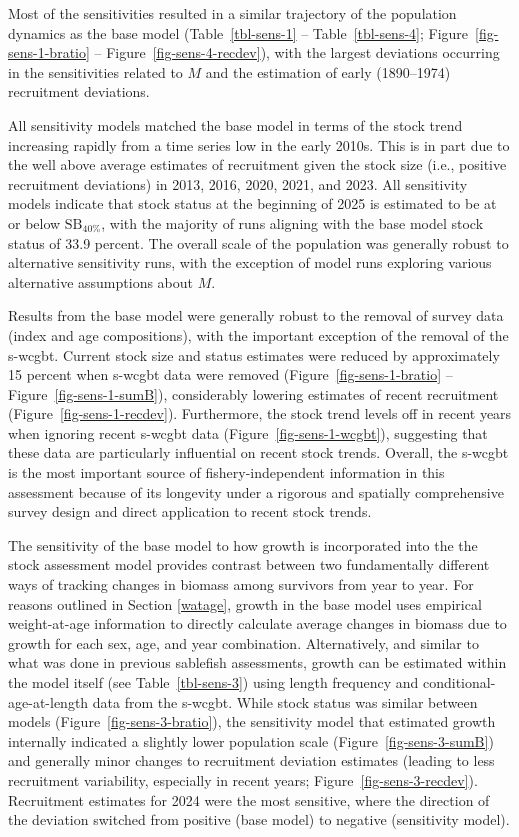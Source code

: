 \documentclass[
  english,
]{article}
\begin{document}
Most of the sensitivities resulted in a similar trajectory of the
population dynamics as the base model (Table~\ref{tbl-sens-1} --
Table~\ref{tbl-sens-4}; Figure~\ref{fig-sens-1-bratio} --
Figure~\ref{fig-sens-4-recdev}), with the largest deviations occurring
in the sensitivities related to \(M\) and the estimation of early
(1890--1974) recruitment deviations.

All sensitivity models matched the base model in terms of the stock
trend increasing rapidly from a time series low in the early 2010s. This
is in part due to the well above average estimates of recruitment given
the stock size (i.e., positive recruitment deviations) in 2013, 2016,
2020, 2021, and 2023. All sensitivity models indicate that stock status
at the beginning of 2025 is estimated to be at or below
\(\text{SB}_{40\%}\), with the majority of runs aligning with the base
model stock status of 33.9 percent. The overall scale of the population
was generally robust to alternative sensitivity runs, with the exception
of model runs exploring various alternative assumptions about \(M\).

Results from the base model were generally robust to the removal of
survey data (index and age compositions), with the important exception
of the removal of the \gls{s-wcgbt}. Current stock size and status
estimates were reduced by approximately 15 percent when \gls{s-wcgbt}
data were removed (Figure~\ref{fig-sens-1-bratio} --
Figure~\ref{fig-sens-1-sumB}), considerably lowering estimates of recent
recruitment (Figure~\ref{fig-sens-1-recdev}). Furthermore, the stock
trend levels off in recent years when ignoring recent \gls{s-wcgbt} data
(Figure~\ref{fig-sens-1-wcgbt}), suggesting that these data are
particularly influential on recent stock trends. Overall, the
\gls{s-wcgbt} is the most important source of fishery-independent
information in this assessment because of its longevity under a rigorous
and spatially comprehensive survey design and direct application to
recent stock trends.

The sensitivity of the base model to how growth is incorporated into the
the stock assessment model provides contrast between two fundamentally
different ways of tracking changes in biomass among survivors from year
to year. For reasons outlined in Section \ref{watage}, growth in the
base model uses empirical weight-at-age information to directly
calculate average changes in biomass due to growth for each sex, age,
and year combination. Alternatively, and similar to what was done in
previous sablefish assessments, growth can be estimated within the model
itself (see Table~\ref{tbl-sens-3}) using length frequency and
conditional-age-at-length data from the \gls{s-wcgbt}. While stock
status was similar between models (Figure~\ref{fig-sens-3-bratio}), the
sensitivity model that estimated growth internally indicated a slightly
lower population scale (Figure~\ref{fig-sens-3-sumB}) and generally
minor changes to recruitment deviation estimates (leading to less
recruitment variability, especially in recent years;
Figure~\ref{fig-sens-3-recdev}). Recruitment estimates for 2024 were the
most sensitive, where the direction of the deviation switched from
positive (base model) to negative (sensitivity model).
\end{document}
